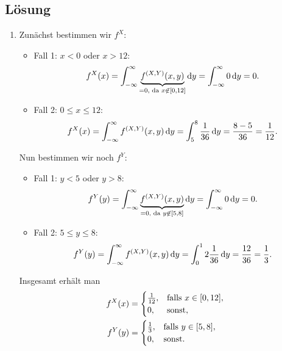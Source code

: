 \documentclass{exercise}
\begin{document}
    \subsection*{Lösung}
    \begin{enumerate}
        \item Zunächst bestimmen wir \(f^X\):
        \begin{itemize}
            \item Fall 1: \(x < 0\) oder \(x > 12\):
            \[
                f^X\parentheses*{x} = \int_{-\infty}^\infty\underbrace{f^{\parentheses*{X, Y}}\parentheses*{x, y}}_{= 0\text{, da }x \not\in \brackets*{0, 12}}\d y = \int_{-\infty}^\infty 0\d y = 0.
            \]
            \item Fall 2: \(0 \le x \le 12\):
            \[
                f^X\parentheses*{x} = \int_{-\infty}^\infty f^{\parentheses*{X, Y}}\parentheses*{x, y}\d y = \int_5^8 \frac{1}{36}\d y = \frac{8 - 5}{36} = \frac{1}{12}.
            \]
        \end{itemize}
        Nun bestimmen wir noch \(f^Y\):
        \begin{itemize}
            \item Fall 1: \(y < 5\) oder \(y > 8\):
            \[
                f^Y\parentheses*{y} = \int_{-\infty}^\infty\underbrace{f^{\parentheses*{X, Y}}\parentheses*{x, y}}_{= 0\text{, da }y \not\in \brackets*{5, 8}}\d y = \int_{-\infty}^\infty 0\d y = 0.
            \]
            \item Fall 2: \(5 \le y \le 8\):
            \[
                f^Y\parentheses*{y} = \int_{-\infty}^\infty f^{\parentheses*{X, Y}}\parentheses*{x, y}\d y = \int_0^12 \frac{1}{36}\d y = \frac{12}{36} = \frac{1}{3}.
            \]
        \end{itemize}
        Insgesamt erhält man
        \begin{align}
            f^X\parentheses*{x} &= \begin{cases}
                \frac{1}{12}, & \text{falls }x \in \brackets*{0, 12},\\
                0, & \text{sonst},
            \end{cases}\label{eq:1}\\
            f^Y\parentheses*{y} &= \begin{cases}
                \frac{1}{3}, & \text{falls }y \in \brackets*{5, 8},\\
                0, & \text{sonst}.
            \end{cases}\label{eq:2}
        \end{align}

\end{enumerate}
\end{document}
